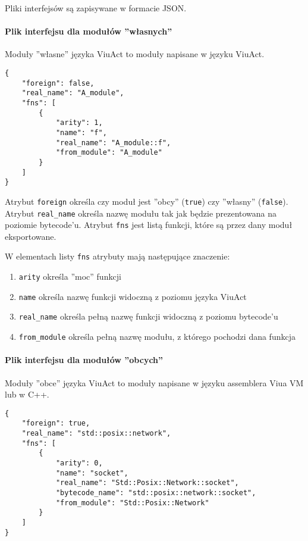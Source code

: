 Pliki interfejsów są zapisywane w formacie JSON.

\paragraph{Plik interfejsu dla modułów ''własnych''}

Moduły ''własne'' języka ViuAct to moduły napisane w języku ViuAct.

\begin{lstlisting}
{
    "foreign": false,
    "real_name": "A_module",
    "fns": [
        {
            "arity": 1,
            "name": "f",
            "real_name": "A_module::f",
            "from_module": "A_module"
        }
    ]
}
\end{lstlisting}

Atrybut \texttt{foreign} określa czy moduł jest ''obcy'' (\texttt{true}) czy ''własny'' (\texttt{false}).
Atrybut \texttt{real\_name} określa nazwę modułu tak jak będzie prezentowana na poziomie bytecode'u.
Atrybut \texttt{fns} jest listą funkcji, które są przez dany moduł eksportowane.

W elementach listy \texttt{fns} atrybuty mają następujące znaczenie:

\begin{enumerate}
    \item \texttt{arity} określa ''moc'' funkcji
    \item \texttt{name} określa nazwę funkcji widoczną z poziomu języka ViuAct
    \item \texttt{real\_name} określa pełną nazwę funkcji widoczną z poziomu bytecode'u
    \item \texttt{from\_module} określa pełną nazwę modułu, z którego pochodzi dana funkcja
\end{enumerate}

\paragraph{Plik interfejsu dla modułów ''obcych''}
\label{pliki_interfejsow_modulow_obcych}

Moduły ''obce'' języka ViuAct to moduły napisane w języku assemblera Viua VM lub w C++.

\begin{lstlisting}
{
    "foreign": true,
    "real_name": "std::posix::network",
    "fns": [
        {
            "arity": 0,
            "name": "socket",
            "real_name": "Std::Posix::Network::socket",
            "bytecode_name": "std::posix::network::socket",
            "from_module": "Std::Posix::Network"
        }
    ]
}
\end{lstlisting}

